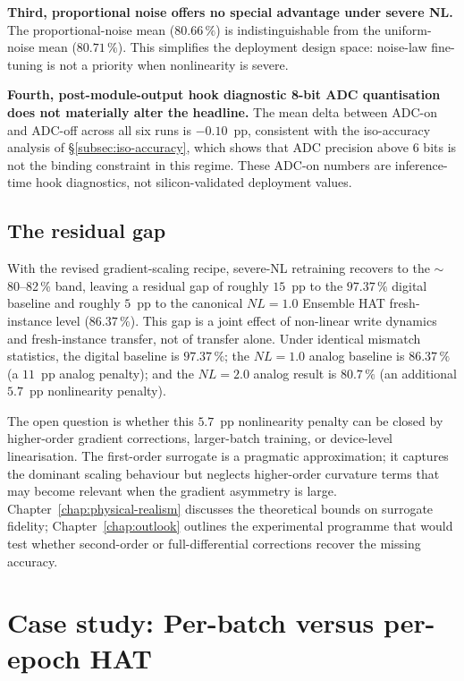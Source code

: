 \textbf{Third, proportional noise offers no special advantage under severe NL.}  The proportional-noise mean ($80.66\,\%$) is indistinguishable from the uniform-noise mean ($80.71\,\%$).  This simplifies the deployment design space: noise-law fine-tuning is not a priority when nonlinearity is severe.

\textbf{Fourth, post-module-output hook diagnostic 8-bit ADC quantisation does not materially alter the headline.}  The mean delta between ADC-on and ADC-off across all six runs is $-0.10$~pp, consistent with the iso-accuracy analysis of \S\ref{subsec:iso-accuracy}, which shows that ADC precision above 6 bits is not the binding constraint in this regime. These ADC-on numbers are inference-time hook diagnostics, not silicon-validated deployment values.

\subsection{The residual gap}

With the revised gradient-scaling recipe, severe-NL retraining recovers to the $\sim$80--82\,\% band, leaving a residual gap of roughly $15$~pp to the $97.37\,\%$ digital baseline and roughly $5$~pp to the canonical $NL=1.0$ Ensemble HAT fresh-instance level ($86.37\,\%$).  This gap is a joint effect of non-linear write dynamics and fresh-instance transfer, not of transfer alone.  Under identical mismatch statistics, the digital baseline is $97.37\,\%$; the $NL=1.0$ analog baseline is $86.37\,\%$ (a $11$~pp analog penalty); and the $NL=2.0$ analog result is $80.7\,\%$ (an additional $5.7$~pp nonlinearity penalty).

The open question is whether this $5.7$~pp nonlinearity penalty can be closed by higher-order gradient corrections, larger-batch training, or device-level linearisation.  The first-order surrogate is a pragmatic approximation; it captures the dominant scaling behaviour but neglects higher-order curvature terms that may become relevant when the gradient asymmetry is large.  Chapter~\ref{chap:physical-realism} discusses the theoretical bounds on surrogate fidelity; Chapter~\ref{chap:outlook} outlines the experimental programme that would test whether second-order or full-differential corrections recover the missing accuracy.

\section{Case study: Per-batch versus per-epoch HAT}
\label{sec:case-cadence}


